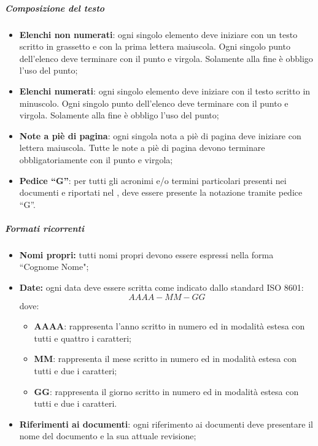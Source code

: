 				\subparagraph{Composizione del testo}
				\begin{itemize}
					\item \textbf{Elenchi non numerati}: ogni singolo elemento deve iniziare con un testo scritto in grassetto e con la prima lettera maiuscola. Ogni singolo punto dell'elenco deve terminare con il punto e virgola. Solamente alla fine è obbligo l'uso del punto;
					\item \textbf{Elenchi numerati}: ogni singolo elemento deve iniziare con il testo scritto in minuscolo. Ogni singolo punto dell'elenco deve terminare con il punto e virgola. Solamente alla fine è obbligo l'uso del punto;
					\item \textbf{Note a piè di pagina}: ogni singola nota a piè di pagina deve iniziare con lettera maiuscola. Tutte le note a piè di pagina devono terminare obbligatoriamente con il punto e virgola;
					\item \textbf{Pedice ``G''}: per tutti gli acronimi e/o termini particolari presenti nei documenti e riportati nel \docGlossary, deve essere presente la notazione tramite pedice ``G''.
				\end{itemize}

				\subparagraph{Formati ricorrenti}
				\begin{itemize}
					\item \textbf{Nomi propri:} tutti nomi propri devono essere espressi nella forma ``Cognome Nome";
					\item \textbf{Date:} ogni data deve essere scritta come indicato dallo standard ISO 8601:\\
						\begin{displaymath}
							AAAA-MM-GG
						\end{displaymath}
						dove:
						\begin{itemize}
							\item \textbf{AAAA}: rappresenta l'anno scritto in numero ed in modalità estesa con tutti e quattro i caratteri;
							\item \textbf{MM}: rappresenta il mese scritto in numero ed in modalità estesa con tutti e due i caratteri;
							\item \textbf{GG}: rappresenta il giorno scritto in numero ed in modalità estesa con tutti e due i caratteri.
						\end{itemize}
					\item \textbf{Riferimenti ai documenti}: ogni riferimento ai documenti deve presentare il nome del documento e la sua attuale revisione;
				\end{itemize}


